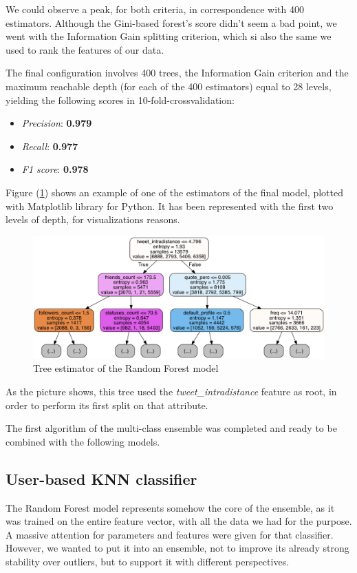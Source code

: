 We could observe a peak, for both criteria, in correspondence with 400 estimators.
Although the Gini-based forest's score didn't seem a bad point, we went with the Information Gain splitting criterion, which si also the same we used to rank the features of our data.

The final configuration involves 400 trees, the Information Gain criterion and the maximum reachable depth (for each of the 400 estimators) equal to 28 levels, yielding the following scores in 10-fold-crossvalidation:
\begin{itemize}
	\item[\PencilRight] \textit{Precision}: \textbf{0.979}
	\item[\PencilRight] \textit{Recall}: \textbf{0.977}
	\item[\PencilRight] \textit{F1 score}: \textbf{0.978}
\end{itemize}

Figure (\ref{fig:tree}) shows an example of one of the estimators of the final model, plotted with Matplotlib library for Python. It has been represented with the first two levels of depth, for visualizations reasons.

\begin{figure}[htp!]
	\centering
	\includegraphics[width=\columnwidth]{chapter5/figure/tree.png}
	\caption{Tree estimator of the Random Forest model}
	\label{fig:tree}
\end{figure}

As the picture shows, this tree used the \textit{tweet\_intradistance} feature as root, in order to perform its first split on that attribute.

The first algorithm of the multi-class ensemble was completed and ready to be combined with the following models.

\subsection{User-based KNN classifier}
The Random Forest model represents somehow the core of the ensemble, as it was trained on the entire feature vector, with all the data we had for the purpose. A massive attention for parameters and features were given for that classifier. 
However, we wanted to put it into an ensemble, not to improve its already strong stability over outliers, but to support it with different perspectives.

